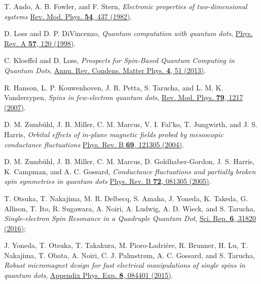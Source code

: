 \documentclass[aps,floatfix,twocolumn,showpacs,10pt,nofootinbib]{revtex4-1}
\begin{document}
\begin{thebibliography}{99}

T. Ando, A. B. Fowler, and F. Stern, \textit{Electronic properties of two-dimensional systems}
\href{http://dx.doi.org/10.1103/RevModPhys.54.437}{Rev. Mod. Phys. \textbf{54}, 437 (1982)}.


D. Loss and D. P. DiVincenzo, \textit{Quantum computation with quantum dots},
\href{https://doi.org/10.1103/PhysRevA.57.120}{Phys. Rev. A {\bf 57}, 120 (1998)}.

 C. Kloeffel and D. Loss, \textit{Prospects for Spin-Based Quantum Computing in Quantum Dots}, \href{http://www.annualreviews.org/doi/abs/10.1146/annurev-conmatphys-030212-184248}{Annu. Rev. Condens. Matter Phys. \textbf{4}, 51 (2013)}.

 R. Hanson, L. P. Kouwenhoven, J. R. Petta, S. Tarucha, and L. M. K. Vandersypen, \textit{Spins in few-electron quantum dots}, \href{http://journals.aps.org/rmp/abstract/10.1103/RevModPhys.79.1217}{Rev. Mod. Phys. \textbf{79}, 1217 (2007)}.

D. M. Zumb\"uhl, J. B. Miller, C. M. Marcus, V. I. Fal'ko, T. Jungwirth, and J. S. Harris,
\textit{Orbital effects of in-plane magnetic fields probed by mesoscopic conductance fluctuations}
\href{https://doi.org/10.1103/PhysRevB.69.121305}{Phys. Rev. B {\bf 69}, 121305 (2004)}.

D. M. Zumb\"uhl, J. B. Miller, C. M. Marcus, D. Goldhaber-Gordon, J. S. Harris, K. Campman, and A. C. Gossard,
\textit{Conductance fluctuations and partially broken spin symmetries in quantum dots}
\href{https://doi.org/10.1103/PhysRevB.72.081305}{Phys. Rev. B {\bf 72}, 081305 (2005)}.

T. Otsuka, T. Nakajima, M. R. Delbecq, S. Amaha, J. Yoneda, K. Takeda, G. Allison, T. Ito, R. Sugawara, A. Noiri, A. Ludwig, A. D. Wieck, and S. Tarucha, \textit{Single-electron Spin Resonance in a Quadruple Quantum Dot},
\href{http://dx.doi.org/10.1038/srep31820}{Sci. Rep. {\bf 6}, 31820 (2016)};

J. Yoneda, T. Otsuka, T. Takakura, M. Pioro-Ladri{\'e}re, R. Brunner, H. Lu, T. Nakajima, T. Obata, A. Noiri, C. J. Palmstr{\o}m, A. C. Gossard, and S. Tarucha, \textit{Robust micromagnet design for fast electrical manipulations of single spins in quantum dots},
\href{http://dx.doi.org/10.7567/APEX.8.084401}{Appendix Phys. Exp. {\bf 8}, 084401 (2015)}.


\end{thebibliography}
\end{document}
